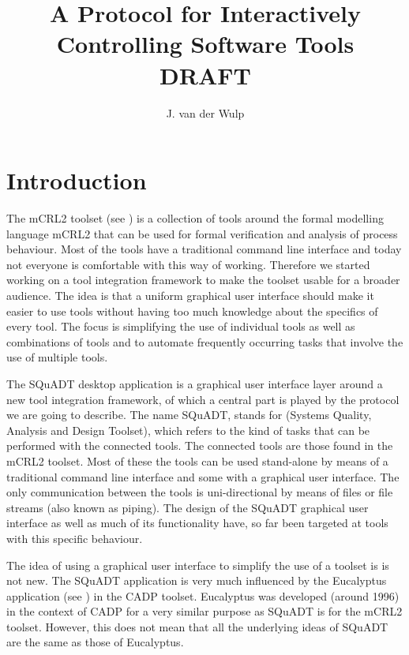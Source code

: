 \documentclass{article}
\title{A Protocol for Interactively Controlling Software Tools\\DRAFT}
\author{J. van der Wulp}
\newcommand{\squadt}{SQuADT\xspace}
\begin{document}
\maketitle
\thispagestyle{empty}

 \section{Introduction}

  The mCRL2 toolset (see \cite{groote_et_al:DSP:2007:862}) is a collection of
  tools around the formal modelling language mCRL2 that can be used for formal
  verification and analysis of process behaviour.  Most of the tools have a
  traditional command line interface and today not everyone is comfortable with
  this way of working.  Therefore we started working on a tool integration
  framework to make the toolset usable for a broader audience. The idea is that
  a uniform graphical user interface should make it easier to use tools without
  having too much knowledge about the specifics of every tool.  The focus is
  simplifying the use of individual tools as well as combinations of tools and
  to automate frequently occurring tasks that involve the use of multiple
  tools.
  
  The \squadt desktop application is a graphical user interface layer around a
  new tool integration framework, of which a central part is played by the
  protocol we are going to describe.  The name \squadt, stands for (Systems
  Quality, Analysis and Design Toolset), which refers to the kind of tasks that
  can be performed with the connected tools. The connected tools are those
  found in the mCRL2 toolset. Most of these the tools can be used stand-alone
  by means of a traditional command line interface and some with a graphical
  user interface.  The only communication between the tools is uni-directional
  by means of files or file streams (also known as piping). The design of the
  \squadt graphical user interface as well as much of its functionality have,
  so far been targeted at tools with this specific behaviour.
  
  The idea of using a graphical user interface to simplify the use of a toolset
  is is not new. The \squadt application is very much influenced by the
  Eucalyptus application (see \cite{CADP}) in the CADP toolset. Eucalyptus was
  developed (around 1996) in the context of CADP for a very similar purpose as
  \squadt is for the mCRL2 toolset. However, this does not mean that all the
  underlying ideas of \squadt are the same as those of Eucalyptus.
  
\end{document}
